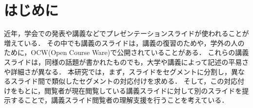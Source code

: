 \documentclass{js}
\begin{document}
\pagestyle{empty}
\maketitle










\section{はじめに}

近年，学会での発表や講義などでプレゼンテーションスライドが使われることが増えている．
その中でも講義のスライドは，講義の復習のためや，学外の人のために，OCW(Open Course Ware)で公開されていることがある．
これらの講義スライドは，同様の話題が書かれたものでも，大学や講義によって記述の平易さや詳細さが異なる．
本研究では，まず，スライドをセグメントに分割し，異なるスライド間で類似したセグメントの対応付けを求める．
そして，この対応付けをもとに，閲覧者が現在閲覧している講義スライドに対して別のスライドを提示することで，講義スライド閲覧者の理解支援を行うことを考えている．

\end{document}
